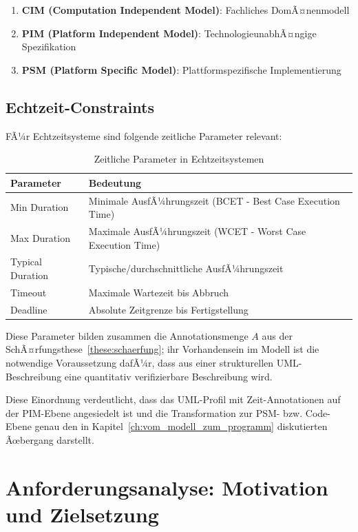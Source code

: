 ﻿\documentclass[a4paper,12pt]{report}
\theoremstyle{definition}
\begin{document}
\begin{enumerate}
	\item[-] \textbf{CIM (Computation Independent Model)}: Fachliches DomÃ¤nenmodell
	\item[-] \textbf{PIM (Platform Independent Model)}: TechnologieunabhÃ¤ngige Spezifikation
	\item[-] \textbf{PSM (Platform Specific Model)}: Plattformspezifische Implementierung
\end{enumerate}

\section{Echtzeit-Constraints}

FÃ¼r Echtzeitsysteme sind folgende zeitliche Parameter relevant:

\begin{table}[H]
	\centering
	\begin{tabular}{@{}lp{8cm}@{}}
		\toprule
		\textbf{Parameter} & \textbf{Bedeutung} \\
		\midrule
		Min Duration & Minimale AusfÃ¼hrungszeit (BCET - Best Case Execution Time) \\
		Max Duration & Maximale AusfÃ¼hrungszeit (WCET - Worst Case Execution Time) \\
		Typical Duration & Typische/durchschnittliche AusfÃ¼hrungszeit \\
		Timeout & Maximale Wartezeit bis Abbruch \\
		Deadline & Absolute Zeitgrenze bis Fertigstellung \\
		\bottomrule
	\end{tabular}
	\caption{Zeitliche Parameter in Echtzeitsystemen}
\label{tab:zeitparameter}
	\label{tab:timing-params}
\end{table}

Diese Parameter bilden zusammen die Annotationsmenge $A$ aus der SchÃ¤rfungsthese~\ref{these:schaerfung}; ihr Vorhandensein im Modell ist die notwendige Voraussetzung dafÃ¼r, dass aus einer strukturellen UML-Beschreibung eine quantitativ verifizierbare Beschreibung wird.

Diese Einordnung verdeutlicht, dass das UML-Profil mit Zeit-Annotationen auf der PIM-Ebene angesiedelt ist und die Transformation zur PSM- bzw. Code-Ebene genau den in Kapitel~\ref{ch:vom_modell_zum_programm} diskutierten Ãœbergang darstellt.

\chapter{Anforderungsanalyse: Motivation und Zielsetzung}
\end{document}

